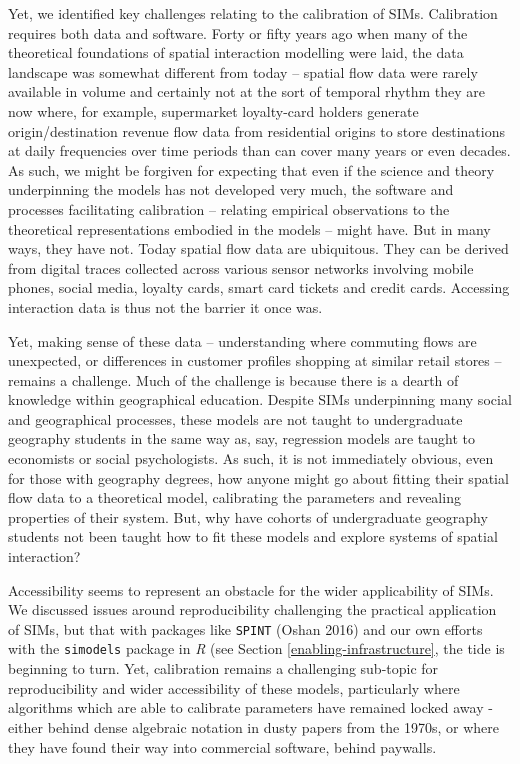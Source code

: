 \documentclass[11pt,letterpaper]{article}
\begin{document}
Yet, we identified key challenges relating to the calibration of SIMs.
Calibration requires both data and software.
Forty or fifty years ago when many of the theoretical foundations of spatial interaction modelling were laid, the data landscape was somewhat different from today -- spatial flow data were rarely available in volume and certainly not at the sort of temporal rhythm they are now where, for example, supermarket loyalty-card holders generate origin/destination revenue flow data from residential origins to store destinations at daily frequencies over time periods than can cover many years or even decades.
As such, we might be forgiven for expecting that even if the science and theory underpinning the models has not developed very much, the software and processes facilitating calibration -- relating empirical observations to the theoretical representations embodied in the models -- might have.
But in many ways, they have not.
Today spatial flow data are ubiquitous.
They can be derived from digital traces collected across various sensor networks involving mobile phones, social media, loyalty cards, smart card tickets and credit cards.
Accessing interaction data is thus not the barrier it once was.

Yet, making sense of these data -- understanding where commuting flows are unexpected, or differences in customer profiles shopping at similar retail stores -- remains a challenge.
Much of the challenge is because there is a dearth of knowledge within geographical education.
Despite SIMs underpinning many social and geographical processes, these models are not taught to undergraduate geography students in the same way as, say, regression models are taught to economists or social psychologists.
As such, it is not immediately obvious, even for those with geography degrees, how anyone might go about fitting their spatial flow data to a theoretical model, calibrating the parameters and revealing properties of their system.
But, why have cohorts of undergraduate geography students not been taught how to fit these models and explore systems of spatial interaction?

Accessibility seems to represent an obstacle for the wider applicability of SIMs.
We discussed issues around reproducibility challenging the practical application of SIMs, but that with packages like \texttt{SPINT} (Oshan 2016) and our own efforts with the \texttt{simodels} package in \emph{R} (see Section \ref{enabling-infrastructure}, the tide is beginning to turn.
Yet, calibration remains a challenging sub-topic for reproducibility and wider accessibility of these models, particularly where algorithms which are able to calibrate parameters have remained locked away - either behind dense algebraic notation in dusty papers from the 1970s, or where they have found their way into commercial software, behind paywalls.
\end{document}
